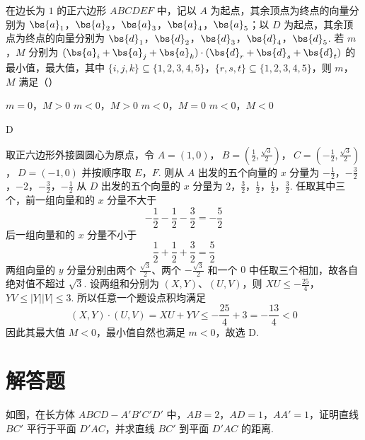 \begin{problem}
在边长为 \(1\) 的正六边形 \(ABCDEF\) 中，记以 \(A\) 为起点，其余顶点为终点的向量分别为 \(\bs{a}_1\)，\(\bs{a}_2\)，\(\bs{a}_3\)，\(\bs{a}_4\)，\(\bs{a}_5\)；以 \(D\) 为起点，其余顶点为终点的向量分别为 \(\bs{d}_1\)，\(\bs{d}_2\)，\(\bs{d}_3\)，\(\bs{d}_4\)，\(\bs{d}_5\). 若 \(m\)，\(M\) 分别为 \((\bs{a}_i+\bs{a}_j+\bs{a}_k)\cdot(\bs{d}_r+\bs{d}_s+\bs{d}_t)\) 的最小值，最大值，其中 \(\{i,j,k\}\subseteq\{1,2,3,4,5\}\)，\(\{r,s,t\}\subseteq\{1,2,3,4,5\}\)，则 \(m\)，\(M\) 满足（\quad）

\choices
    {\(m=0\)，\(M>0\)}
    {\(m<0\)，\(M>0\)}
    {\(m<0\)，\(M=0\)}
    {\(m<0\)，\(M<0\)}
\begin{answer}
D
\end{answer}

\begin{solution}
取正六边形外接圆圆心为原点，令
\(A=(1,0)\)，\(\ B=\left(\frac12,\frac{\sqrt3}{2}\right)\)，\(\ C=\left(-\frac12,\frac{\sqrt3}{2}\right)\)，\(\ D=(-1,0)\)
并按顺序取 \(E\)，\(F\). 则从 \(A\) 出发的五个向量的 \(x\) 分量为
\(-\frac12\)，\(-\frac32\)，\(-2\)，\(-\frac32\)，\(-\frac12\)
从 \(D\) 出发的五个向量的 \(x\) 分量为
\(2\)，\(\frac32\)，\(\frac12\)，\(\frac12\)，\(\frac32\).
任取其中三个，前一组向量和的 \(x\) 分量不大于
\[
-\frac12-\frac12-\frac32=-\frac52
\]
后一组向量和的 \(x\) 分量不小于
\[
\frac12+\frac12+\frac32=\frac52
\]
两组向量的 \(y\) 分量分别由两个 \(\frac{\sqrt3}{2}\)、两个 \(-\frac{\sqrt3}{2}\) 和一个 \(0\) 中任取三个相加，故各自绝对值不超过 \(\sqrt3\). 设两组和分别为 \((X,Y)\)、\((U,V)\)，则
\(XU\leqslant-\frac{25}{4}\)，\(YV\leqslant|Y||V|\leqslant3\).
所以任意一个题设点积均满足
\[
(X,Y)\cdot(U,V)=XU+YV\leqslant-\frac{25}{4}+3=-\frac{13}{4}<0
\]
因此其最大值 \(M<0\)，最小值自然也满足 \(m<0\)，故选 D.
\end{solution}
\end{problem}

\section{解答题}

\begin{problem}
如图，在长方体 \(ABCD-A'B'C'D'\) 中，\(AB=2\)，\(AD=1\)，\(AA'=1\)，证明直线 \(BC'\) 平行于平面 \(D'AC\)，并求直线 \(BC'\) 到平面 \(D'AC\) 的距离.
\end{problem}

